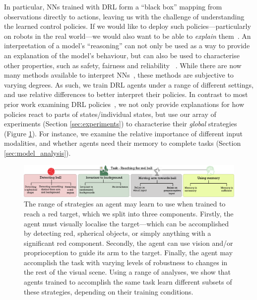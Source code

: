 In particular, NNs trained with DRL form a ``black box'' mapping from observations directly to actions, leaving us with the challenge of understanding the learned control policies. If we would like to deploy such policies---particularly on robots in the real world---we would also want to be able to \emph{explain} them~\cite{arrieta2020explainable}. An interpretation of a model's ``reasoning'' can not only be used as a way to provide an explanation of the model's behaviour, but can also be used to characterise other properties, such as safety, fairness and reliability ~\cite{doshi2017towards}. While there are now many methods available to interpret NNs~\cite{guidotti2018survey}, these methods are subjective to varying degrees. As such, we train DRL agents under a range of different settings, and use relative differences to better interpret their policies. {In contrast to most prior work examining DRL policies}~\cite{atrey2020exploratory, greydanus2018visualizing, olson2021counterfactual, puri2020explain, rupprecht2020finding, such2018atari, zahavy2016graying}, {we not only provide explanations for how policies react to parts of states/individual states, but use our array of experiments (Section \ref{sec:experiments}) to characterise their \emph{global} strategies (Figure \ref{fig:strategies}). For instance, we examine the relative importance of different input modalities, and whether agents need their memory to complete tasks (Section \ref{sec:model_analysis}).}

\begin{figure}
  \centering
  \includegraphics[width=\linewidth]{figures/chapter6/strategies.png}
  \caption{The range of strategies an agent may learn to use when trained to reach a red target, which we split into three components. Firstly, the agent must visually localise the target---which can be accomplished by detecting red, spherical objects, or simply anything with a significant red component. Secondly, the agent can use vision and/or proprioception to guide its arm to the target. Finally, the agent may accomplish the task with varying levels of robustness to changes in the rest of the visual scene. Using a range of analyses, we show that agents trained to accomplish the same task learn different subsets of these strategies, depending on their training conditions.}
  \label{fig:strategies}
\end{figure}

